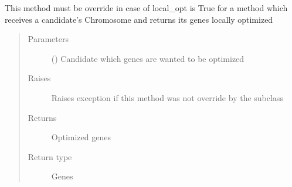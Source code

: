 \documentclass[letterpaper,10pt,english]{sphinxmanual}
\begin{document}
\begin{fulllineitems}
\begin{fulllineitems}
\end{fulllineitems}


\begin{fulllineitems}
\label{\detokenize{MolOpt.genetic:MolOpt.genetic.genetic.Genetic.local_optimize}}
\sphinxAtStartPar
This method must be override in case of local\_opt is True for a method which receives a candidate’s 
Chromosome and returns its genes locally optimized
\begin{quote}\begin{description}
\item[{Parameters}] \leavevmode
\sphinxAtStartPar
{} ({\hyperref[\detokenize{MolOpt.genetic:MolOpt.genetic.genetic.Chromosome}]{}}) \textendash{} Candidate which genes are wanted to be optimized

\item[{Raises}] \leavevmode
\sphinxAtStartPar
{} \textendash{} Raises exception if this method was not override by the subclass

\item[{Returns}] \leavevmode
\sphinxAtStartPar
Optimized genes

\item[{Return type}] \leavevmode
\sphinxAtStartPar
Genes

\end{description}\end{quote}

\end{fulllineitems}



\end{fulllineitems}
\end{document}
